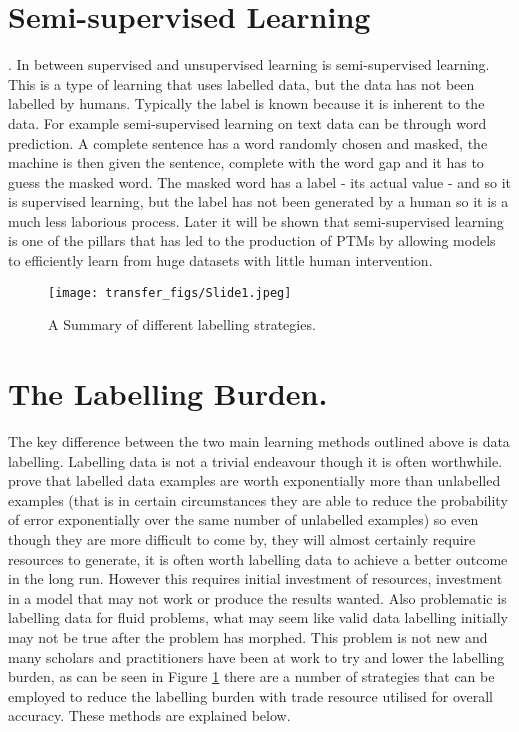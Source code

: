 \section{Semi-supervised Learning}. In between supervised and unsupervised learning is semi-supervised learning. This is a type of learning that uses labelled data, but the data has not been labelled by humans. Typically the label is known because it is inherent to the data. For example semi-supervised learning on text data can be through word prediction. A complete sentence has a word randomly chosen and masked, the machine is then given the sentence, complete with the word gap and it has to guess the masked word. The masked word has a label - its actual value - and so it is supervised learning, but the label has not been generated by a human so it is a much less laborious process. Later it will be shown that semi-supervised learning is one of the pillars that has led to the production of PTMs by allowing models to efficiently learn from huge datasets with little human intervention. 


\begin{figure}
  \texttt{[image: transfer\_figs/Slide1.jpeg]}
  \caption{A Summary of different labelling strategies. }
  \label{fig:label}
\end{figure}

\section{The Labelling Burden.} The key difference between the two main learning methods outlined above is data labelling. Labelling data is not a trivial endeavour though it is often worthwhile.\textcite{castelli1995exponential}  prove that labelled data examples are worth exponentially more than unlabelled examples (that is in certain circumstances they are able to reduce the probability of error exponentially over the same number of unlabelled examples) so even though they are more difficult to come by, they will almost certainly require resources to generate, it is often worth labelling data to achieve a better outcome in the long run. However this requires initial investment of resources, investment in a model that may not work or produce the results wanted. Also problematic is labelling data for fluid problems, what may seem like valid data labelling initially may not be true after the problem has morphed. This problem is not new and many scholars and practitioners have been at work to try and lower the labelling burden, as can be seen in Figure \ref{fig:label}  there are a number of strategies that can be employed to reduce the labelling burden with trade resource utilised for overall accuracy. These methods are explained below.



